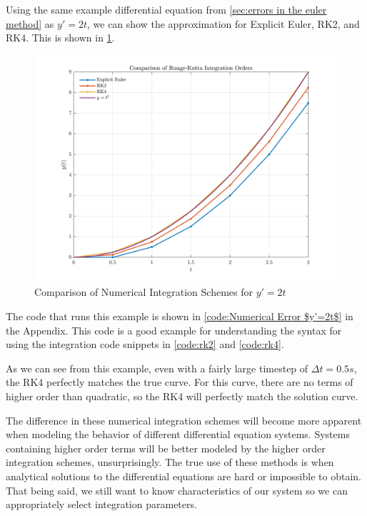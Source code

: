 \documentclass[12pt]{report}
\begin{document}
Using the same example differential equation from \ref{sec:errors in the euler method} as $y'=2t$, we can show the approximation for Explicit Euler, RK2, and RK4. This is shown in \ref{fig:Numerical Comparison}.
\begin{figure}[ht]
    \centering
    \includegraphics[width=\linewidth]{6DoF Explanation Scripts/Numerical Integrator Comparison Figure.png}
    \caption{Comparison of Numerical Integration Schemes for $y'=2t$}
    \label{fig:Numerical Comparison}
\end{figure}
The code that runs this example is shown in \ref{code:Numerical Error $y'=2t$} in the Appendix. This code is a good example for understanding the syntax for using the integration code snippets in \ref{code:rk2} and \ref{code:rk4}.

As we can see from this example, even with a fairly large timestep of $\Delta t=0.5s$, the RK4 perfectly matches the true curve. For this curve, there are no terms of higher order than quadratic, so the RK4 will perfectly match the solution curve.

The difference in these numerical integration schemes will become more apparent when modeling the behavior of different differential equation systems. Systems containing higher order terms will be better modeled by the higher order integration schemes, unsurprisingly. The true use of these methods is when analytical solutions to the differential equations are hard or impossible to obtain. That being said, we still want to know characteristics of our system so we can appropriately select integration parameters.
\end{document}
